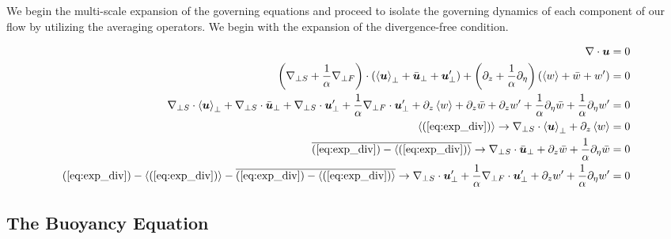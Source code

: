 \documentclass{article}
\begin{document}
We begin the multi-scale expansion of the governing equations and proceed to
isolate the governing dynamics of each component of our flow by utilizing the
averaging operators. We begin with the expansion of the divergence-free
condition.

\begin{align}
    \nabla\cdot\boldsymbol{u} = 0\\
    \left(\nabla_{\perp S} + \frac{1}{\alpha}\nabla_{\perp
    F}\right)\cdot\left(\left<\boldsymbol{u}\right>_{\perp} + \bar{\boldsymbol{u}}_{\perp} +
    \boldsymbol{u}'_{\perp}\right) + \left(\partial_z +
    \frac{1}{\alpha}\partial_{\eta}\right)\left(\left<w\right> + \bar{w} + w'\right)
    = 0 \\
    \nabla_{\perp S} \cdot \left<\boldsymbol{u}\right>_{\perp} + \nabla_{\perp S} \cdot
    \bar{\boldsymbol{u}}_{\perp} + \nabla_{\perp S} \cdot \boldsymbol{u}'_{\perp} +
    \frac{1}{\alpha}\nabla_{\perp F} \cdot \boldsymbol{u}'_{\perp} + \partial_z\left<w\right>
    + \partial_z\bar{w} + \partial_zw' + \frac{1}{\alpha}\partial_{\eta}\bar{w}
    + \frac{1}{\alpha}\partial_{\eta}w'= 0 \label{eq:exp_div}\\
    \left<(\ref{eq:exp_div})\right> \to  \nabla_{\perp S} \cdot \left<\boldsymbol{u}\right>_{\perp} +
    \partial_z\left<w\right> = 0 \label{eq:div_1st_avg}\\
    \overline{(\ref{eq:exp_div}) - \left<(\ref{eq:exp_div})\right>} \to \nabla_{\perp
    S} \cdot \bar{\boldsymbol{u}}_{\perp} + \partial_z\bar{w} +
    \frac{1}{\alpha}\partial_{\eta}\bar{w} = 0 \\
    (\ref{eq:exp_div}) - \left<(\ref{eq:exp_div})\right> -
    \overline{(\ref{eq:exp_div}) - \left<(\ref{eq:exp_div})\right>} \to \nabla_{\perp
    S} \cdot \boldsymbol{u}'_{\perp} + \frac{1}{\alpha}\nabla_{\perp F} \cdot
    \boldsymbol{u}'_{\perp} + \partial_zw' + \frac{1}{\alpha}\partial_{\eta}w' = 0 
\end{align}

\subsection{The Buoyancy Equation}
\end{document}
